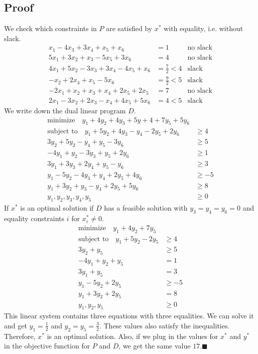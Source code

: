 \documentclass[12pt]{article}
\begin{document}
\subsection*{Proof}
We check which constraints in $P$ are satisfied by $x^*$ with equality, i.e. without slack.
\begin{align*}
x_1 - 4 x_3 + 3 x_4 + x_5 + x_6 &= 1 & \text{no slack} \\
5 x_1 + 3 x_2 + x_3 - 5 x_5 + 3 x_6 &= 4 & \text{no slack} \\
4 x_1 + 5 x_2 - 3 x_3 + 3 x_4 - 4 x_5 + x_6 &= \frac{7}{2} < 4 & \text{slack} \\
-x_2 + 2 x_4 + x_5 - 5 x_6 &= \frac{9}{2} < 5 & \text{slack} \\
-2 x_1 + x_2 + x_3 + x_4 + 2 x_5 + 2 x_5 &=7 & \text{no slack} \\
2 x_1 - 3 x_2 + 2 x_3 - x_4 + 4 x_5 + 5 x_6 &= 4 < 5 & \text{slack}
\end{align*}
We write down the dual linear program $D$.
\begin{align*}
\text{minimize} \quad y_1 + 4 y_2 + 4 y_3 + 5 y+4 + 7 y_5 + 5 y_6& \\
\text{subject to} \quad  y_1 + 5 y_2 + 4 y_3 - y_4 - 2 y_5 + 2 y_6 &\geq 4 \\
3 y_2 + 5 y_2 - y_4 + y_5 - 3 y_6 &\geq 5 \\
-4 y_1 + y_2 - 3 y_3 + y_5 + 2 y_6 &\geq 1 \\
3 y_1 + 3 y_3 + 2 y_4 + y_5 - y_6 &\geq 3 \\
y_1 - 5 y_2 - 4 y_3 + y_4 + 2 y_5 + 4 y_6 &\geq -5\\
y_1 + 3 y_2 + y_3 -  y_4 + 2 y_5 + 5 y_6 & \geq 8 \\
y_1, y_2, y_3, y_4, y_5 &\geq 0
\end{align*}
If $x^*$ is an optimal solution if $D$ has a feasible solution with $y_3 = y_4 = y_6 = 0$ and equality constraints $i$ for $x_i^* \not= 0$.
\begin{align*}
\text{minimize} \quad y_1 + 4 y_2 + 7 y_5 &\\
\text{subject to} \quad y_1 + 5 y_2 - 2 y_5 &\geq 4 \\
3 y_2 + y_5 &\geq 5 \\
-4 y_1 + y_2 + y_5 &= 1 \\
3 y_1 + y_5 &= 3 \\
y_1 - 5 y_2 + 2 y_5 &\geq -5 \\
y_1 + 3 y_2 + 2 y_5 &= 8 \\
y_1, y_2, y_5 &\geq 0
\end{align*}
This linear system contains three equations with three equalities. We can solve it and get $y_1= \frac{1}{2}$ and $y_2 = y_5 = \frac{3}{2}$. These values also satisfy the inequalities. Therefore, $x^*$ is an optimal solution. Also, if we plug in the values for $x^*$ and $y^*$ in the objective function for $P$ and $D$, we get the same value $17$.\hfill $\blacksquare$
\end{document}
